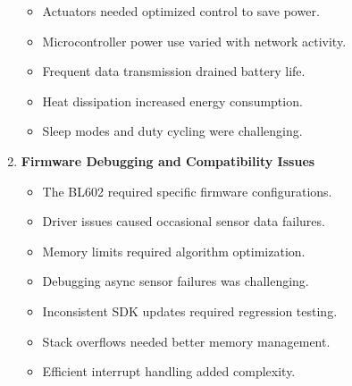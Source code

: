 \documentclass[a4paper]{scrartcl}
\begin{document}
\begin{enumerate}
\begin{itemize}
    \item Actuators needed optimized control to save power.  
    \item Microcontroller power use varied with network activity.  
    \item Frequent data transmission drained battery life.  
    \item Heat dissipation increased energy consumption.  
    \item Sleep modes and duty cycling were challenging.  
\end{itemize}
    \item \textbf{Firmware Debugging and Compatibility Issues}
     \begin{itemize}
    \item The BL602 required specific firmware configurations.  
    \item Driver issues caused occasional sensor data failures.  
    \item Memory limits required algorithm optimization.  
    \item Debugging async sensor failures was challenging.  
    \item Inconsistent SDK updates required regression testing.  
    \item Stack overflows needed better memory management.  
    \item Efficient interrupt handling added complexity.  
\end{itemize}

\end{enumerate}
\end{document}
